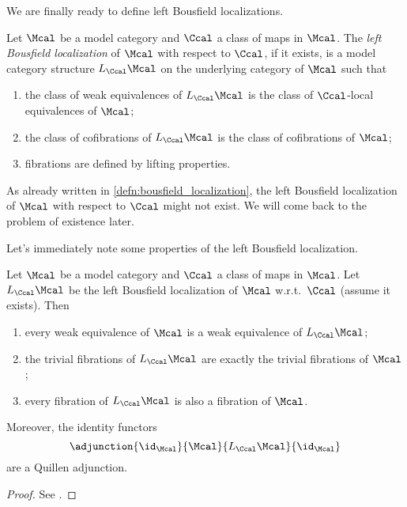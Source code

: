         We are finally ready to define left Bousfield localizations.
        \begin{defn}
            \label{defn:bousfield_localization}
            Let $\Mcal$ be a model category and $\Ccal$ a class of maps in $\Mcal$. The \emph{left Bousfield localization} of $\Mcal$ with respect to $\Ccal$, if it exists, is a model category structure $L_{\Ccal}\Mcal$ on the underlying category of $\Mcal$ such that 
            \begin{enumerate}[label=(\alph*)]
                \item the class of weak equivalences of $L_{\Ccal}\Mcal$ is the class of $\Ccal$-local equivalences of $\Mcal$;
                \item the class of cofibrations of $L_{\Ccal}\Mcal$ is the class of cofibrations of $\Mcal$;
                \item fibrations are defined by lifting properties.
            \end{enumerate}
        \end{defn}
        \begin{remark}
            As already written in \cref{defn:bousfield_localization}, the left Bousfield localization of $\Mcal$ with respect to $\Ccal$ might not exist. We will come back to the problem of existence later.
        \end{remark}
        Let's immediately note some properties of the left Bousfield localization.
        \begin{prop}
            \label{prop:bousfield_localization_properties}
            Let $\Mcal$ be a model category and $\Ccal$ a class of maps in $\Mcal$. Let $L_{\Ccal}\Mcal$ be the left Bousfield localization of $\Mcal$ w.r.t.\ $\Ccal$ (assume it exists). Then 
            \begin{enumerate}[label=(\alph*)]
                \item every weak equivalence of $\Mcal$ is a weak equivalence of $L_{\Ccal}\Mcal$;
                \item the trivial fibrations of $L_{\Ccal}\Mcal$ are exactly the trivial fibrations of $\Mcal$;
                \item every fibration of $L_{\Ccal}\Mcal$ is also a fibration of $\Mcal$.
            \end{enumerate}
            Moreover, the identity functors \[\adjunction{\id_{\Mcal}}{\Mcal}{ L_{\Ccal}\Mcal}{ \id_{\Mcal}} \] are a Quillen adjunction.
        \end{prop}
        \begin{proof}
            See \cite[Proposition~3.3.3]{Hirs:loc}.
        \end{proof}

